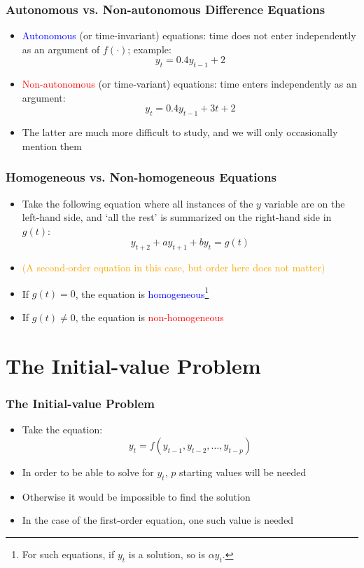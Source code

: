 \documentclass[10pt,usenames,dvipsnames]{beamer}
\theoremstyle{plain}
\theoremstyle{definition}
\begin{document}
\begin{frame}[fragile]
\frametitle{Autonomous vs. Non-autonomous Difference Equations}
\begin{itemize}
	\item \textcolor{blue}{Autonomous} (or time-invariant) equations: time does not enter independently as an argument of $f(\cdot)$; example:
	\[
		y_{t} = 0.4y_{t-1} + 2
	\]
	\item \textcolor{red}{Non-autonomous} (or time-variant) equations: time enters independently as an argument:
	\[
		y_{t} = 0.4y_{t-1} + 3t + 2
	\]
	\item The latter are much more difficult to study, and we will only occasionally mention them
\end{itemize}
\end{frame}

\begin{frame}[fragile]
\frametitle{Homogeneous vs. Non-homogeneous Equations}
\begin{itemize}
	\item Take the following equation where all instances of the $y$ variable are on the left-hand side, and `all the rest' is summarized on the right-hand side in $g(t)$:
	\[
		y_{t+2} + ay_{t+1} + by_{t} = g(t)
	\]
	\item \textcolor{orange}{(A second-order equation in this case, but order here does not matter)}
	\item If $g(t) = 0$, the equation is \textcolor{blue}{homogeneous}\footnote{For such equations, if $y_{t}$ is a solution, so is $\alpha y_{t}$.}
	\item If $g(t) \neq 0$, the equation is \textcolor{red}{non-homogeneous}
\end{itemize}
\end{frame}

\section{The Initial-value Problem}
\begin{frame}[fragile]
\frametitle{The Initial-value Problem}
\begin{itemize}
	\item Take the equation:
	\[
		y_{t} = f(y_{t-1}, y_{t-2},\ldots,y_{t-p})
	\]
	\item In order to be able to solve for $y_{t}$, $p$ starting values will be needed
	\item Otherwise it would be impossible to find the solution
	\item In the case of the first-order equation, one such value is needed
\end{itemize}
\end{frame}
\end{document}
